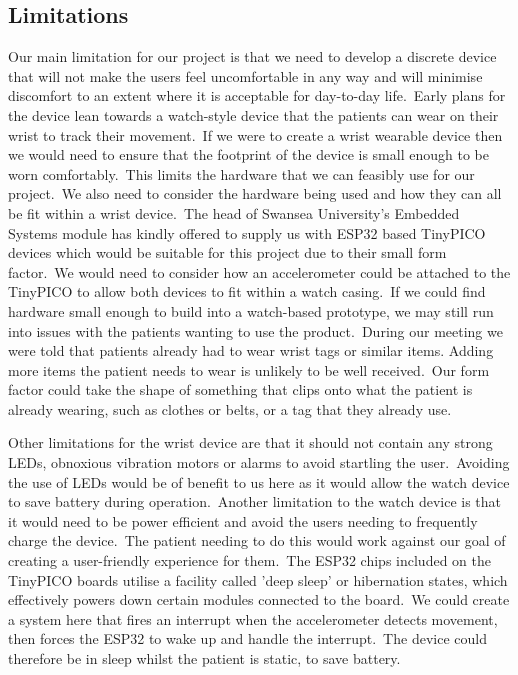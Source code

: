         \subsection{Limitations}
            Our main limitation for our project is that we need to develop a discrete device that will not make the
            users feel uncomfortable in any way and will minimise discomfort to an extent where it is
            acceptable for day-to-day life.\ Early plans for the device lean towards a watch-style device that the
            patients can wear on their wrist to track their movement.\ If we were to create a wrist wearable device
            then we would need to ensure that the footprint of the device is small enough to be worn comfortably.\ This limits
            the hardware that we can feasibly use for our project.\ We also need to consider the hardware being
            used and how they can all be fit within a wrist device.\ The head of Swansea University’s Embedded Systems
            module has kindly offered to supply us with ESP32 based TinyPICO devices which would be suitable for this
            project due to their small form factor.\ We would need to consider how an accelerometer could be attached to
            the TinyPICO to allow both devices to fit within a watch casing.\ If we could find hardware small
            enough to build into a watch-based prototype, we may still run into issues with the patients wanting to use
            the product.\ During our meeting we were told that patients already had to wear wrist tags or similar items.
            Adding more items the patient needs to wear is unlikely to be well received.\ Our form factor could take the
            shape of something that clips onto what the patient is already wearing, such as clothes or belts, or a tag
            that they already use.

            Other limitations for the wrist device are that it should not contain any strong LEDs, obnoxious vibration
            motors or alarms to avoid startling the user.\ Avoiding the use of LEDs would be of benefit to us here as it
            would allow the watch device to save battery during operation.\ Another limitation to the watch device is
            that it would need to be power efficient and avoid the users needing to frequently charge the device.\ The
            patient needing to do this would work against our goal of creating a user-friendly experience for them.\ The
            ESP32 chips included on the TinyPICO boards utilise a facility called 'deep sleep' or hibernation states,
            which effectively powers down certain modules connected to the board.\ We could create a system here that
            fires an interrupt when the accelerometer detects movement, then forces the ESP32 to wake up and handle the
            interrupt.\ The device could therefore be in sleep whilst the patient is static, to save battery.

